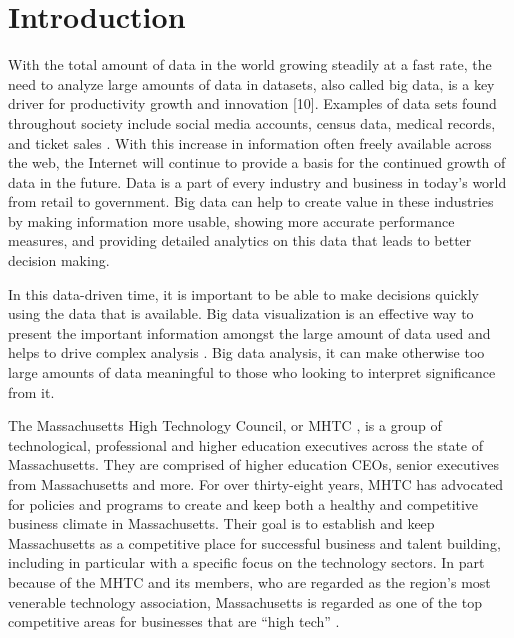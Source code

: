 \chapter{Introduction}

	With the total amount of data in the world growing steadily at a fast rate, 
	the need to analyze large amounts of data in datasets, also called big data, is a 
	key driver for productivity growth and innovation [10]. Examples of data sets found throughout society include social media accounts, census data, medical records, and ticket sales \cite{bdex}. With this increase in 
	information often freely available across the web, 
	the Internet will continue to provide a basis for the continued growth of 
	data in the future. Data is a part of every industry and business in today's 
	world from retail to government. Big data can help to create
	 value in these industries by making information more usable, showing more 
	 accurate performance measures, and providing detailed analytics on this data that 
	 leads to better decision making.

	In this data-driven time, it is important to be able to make decisions 
	quickly using the data that is available. Big data visualization is an 
	effective way to present the important information amongst the large amount 
	of data used and helps to drive complex analysis \cite{bigdata}. Big 
	data analysis, it can make otherwise too large amounts of data meaningful 
	to those who looking to interpret significance from it.

	The Massachusetts High Technology Council, or MHTC \cite{mhtc}, is a group of technological, 
	professional and higher education executives across the state of Massachusetts. 
	They are comprised of higher education CEOs, senior executives from Massachusetts 
	and more. For over thirty-eight years, MHTC has advocated for policies 
	and programs to create and keep both a healthy and competitive business climate in Massachusetts. 
	Their goal is to establish and keep Massachusetts as a competitive place for 
	successful business and talent building, including in particular with a specific focus on the 
	technology sectors. In part because of the MHTC and its members, who are 
	regarded as the region's most venerable technology association, Massachusetts 
	is regarded as one of the top competitive areas for businesses that are “high tech” \cite{mhtc}.

